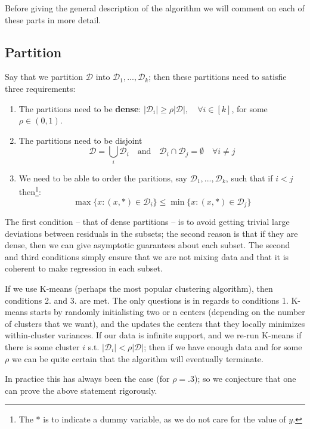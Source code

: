 Before giving the general description of the algorithm we will comment on each of these parts in more detail. 

\subsection{Partition}

Say that we partition $\mathcal{D}$ into $\mathcal{D}_1, ..., \mathcal{D}_k$; then these 
partitions need to satisfie three requirements:

\begin{enumerate}
    \item The partitions need to be \textbf{dense}: 
    $|\mathcal{D}_i| \geq \rho |\mathcal{D}|, \quad \forall i \in [k]$, for some $\rho \in (0, 1)$.
    \item The partitions need to be disjoint 
    $$
    \mathcal{D} = \bigcup_i \mathcal{D}_i \quad \text{and} \quad
    \mathcal{D}_i \cap \mathcal{D}_j = \emptyset \quad \forall i \neq j
    $$
    \item We need to be able to order the paritions, say $\mathcal{D}_1, ..., \mathcal{D}_k$, such that
    if $i < j$ then\footnote{The $*$ is to indicate a dummy variable, as we do not care for the value of $y$.}: 
    $$
    \operatorname{max} \{ x : (x, *) \in \mathcal{D}_i \} \leq 
    \operatorname{min} \{ x : (x, *) \in \mathcal{D}_j \}
    $$
\end{enumerate}

The first condition -- that of dense partitions -- is to avoid getting trivial large deviations between residuals 
in the subsets; the second reason is that if they are dense, then we can give asymptotic guarantees about each subset.
The second and third conditions simply ensure that we are not mixing data and that it is coherent to make regression
in each subset. 

If we use K-means (perhaps the most popular clustering algorithm), then conditions 2. and 3. are met. The only 
questions is in regards to conditions 1. K-means starts by randomly initialisting two or n centers (depending 
on the number of clusters that we want), and the updates the centers that they locally 
minimizes within-cluster variances. If our data is infinite support, and we re-run K-means if there is some cluster
$i$ s.t. $|\mathcal{D}_i| < \rho |\mathcal{D}|$; then if we have enough data and for some $\rho$ we can be quite 
certain that the algorithm will eventually terminate. 

In practice this has always been the case (for $\rho = .3$); so we conjecture that one can prove the above statement 
rigorously. 

